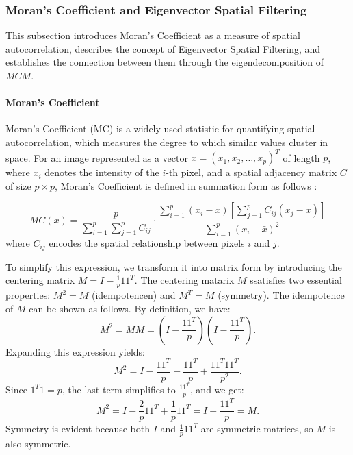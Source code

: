 \documentclass[12pt]{article}
\begin{document}
\subsubsection{Moran's Coefficient and Eigenvector Spatial Filtering}

This subsection introduces Moran’s Coefficient as a measure of spatial autocorrelation, describes the concept of Eigenvector Spatial Filtering, and establishes the connection between them through the eigendecomposition of \( MCM \).


\paragraph{Moran’s Coefficient}

Moran’s Coefficient (MC) is a widely used statistic for quantifying spatial autocorrelation, which measures the degree to which similar values cluster in space. For an image represented as a vector \( x = (x_1, x_2, \dots, x_p)^T \) of length \( p \), where \( x_i \) denotes the intensity of the \( i \)-th pixel, and a spatial adjacency matrix \( C \) of size \( p \times p \), Moran’s Coefficient is defined in summation form as follows \citet{griffith2014spatial}:

\[
  M C(x) = \frac{p}{\sum_{i=1}^p \sum_{j=1}^p C_{ij}} \cdot \frac{\sum_{i=1}^p \left(x_i - \bar{x} \right) \left[ \sum_{j=1}^p C_{ij} \left( x_j - \bar{x} \right) \right]}{\sum_{i=1}^p \left( x_i - \bar{x} \right)^2}
\]
where \( C_{ij} \) encodes the spatial relationship between pixels \( i \) and \( j \). 

To simplify this expression, we transform it into matrix form by introducing the centering matrix \( M = I - \frac{1}{p} 1 1^T \). The centering matarix \( M \) ssatisfies two essential properties: \( M^2 = M \) (idempotencen) and \( M^T = M \) (symmetry). The idempotence of \( M \) can be shown as follows. By definition, we have:
\[
  M^2 = M M = \left( I - \frac{1 1^T}{p} \right) \left( I - \frac{1 1^T}{p} \right).
\]
Expanding this expression yields:
\[
  M^2 = I - \frac{1 1^T}{p} - \frac{1 1^T}{p} + \frac{1 1^T 1 1^T}{p^2}.
\]
Since \( 1^T 1 = p \), the last term simplifies to \( \frac{1 1^T}{p} \), and we get:
\[
  M^2 = I - \frac{2}{p} 1 1^T + \frac{1}{p} 1 1^T = I - \frac{1 1^T}{p} = M.
\]
Symmetry is evident because both \( I \) and \( \frac{1}{p} 1 1^T \) are symmetric matrices, so \( M \) is also symmetric.
\end{document}
